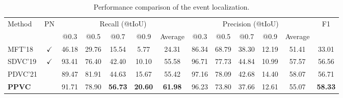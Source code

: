\begin{table}
  \centering
  \caption{
    Performance comparison of the event localization.
  }
  \begin{tabular}{@{}l|c|ccccc|ccccc|c@{}}
    \hline
    \multirow{2}{*}{Method} & \multirow{2}{*}{PN} & \multicolumn{5}{|c|}{Recall (@tIoU)} & \multicolumn{5}{c}{Precision (@tIoU)} & \multirow{2}{*}{F1} \\
    && @0.3 & @0.5 & @0.7 & @0.9 & Average & @0.3 & @0.5 & @0.7 & @0.9 & Average & \\
    \hline
    MFT'18 \cite{xiong2018move} & $\checkmark$ & 46.18 & 29.76 & 15.54 & 5.77 & 24.31 & 86.34 & 68.79 & 38.30 & 12.19 & 51.41 & 33.01 \\
    SDVC'19 \cite{mun2019streamlined} & $\checkmark$ & 93.41 & 76.40 & 42.40 & 10.10 & 55.58 & 96.71 & 77.73 & 44.84 & 10.99 & 57.57 & 56.56 \\
    PDVC'21 \cite{wang2021end} &  & 89.47 & 81.91 & 44.63 & 15.67 & 55.42 & 97.16 & 78.09 & 42.68 & 14.40 & 58.07 & 56.71 \\
    \textbf{PPVC} &  & 91.71 & 78.90 & \textbf{56.73} & \textbf{20.60} & \textbf{61.98} & 96.23 & 73.80 & 37.66 & 12.61 & 55.07 & \textbf{58.33} \\
    \hline
  \end{tabular}
  
  \label{tab:eval_event_localizer}
\end{table}

